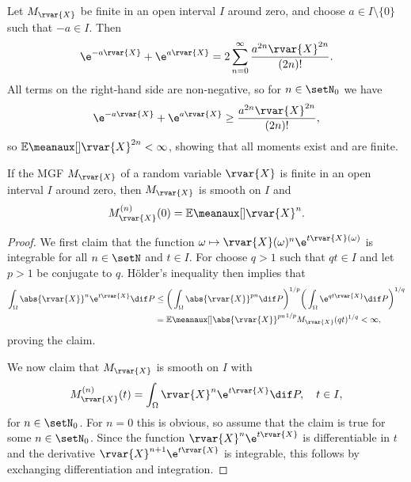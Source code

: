 \documentclass[article, a4paper, 11pt, oneside]{memoir}
\numberwithin{equation}{chapter}
\begin{document}
\begin{proofof}
    Let $M_{\rvar{X}}$ be finite in an open interval $I$ around zero, and choose $a \in I \setminus \{0\}$ such that $-a \in I$. Then
    \begin{equation*}
        \e^{-a\rvar{X}} + \e^{a\rvar{X}}
            = 2 \sum_{n=0}^\infty \frac{a^{2n} \rvar{X}^{2n}}{(2n)!}.
    \end{equation*}
    All terms on the right-hand side are non-negative, so for $n \in \setN_0$ we have
    \begin{equation*}
        \e^{-a\rvar{X}} + \e^{a\rvar{X}}
            \geq \frac{a^{2n} \rvar{X}^{2n}}{(2n)!},
    \end{equation*}
    so $\mean{\rvar{X}^{2n}} < \infty$, showing that all moments exist and are finite.
\end{proofof}


\begin{proposition}
    If the MGF $M_{\rvar{X}}$ of a random variable $\rvar{X}$ is finite in an open interval $I$ around zero, then $M_{\rvar{X}}$ is smooth on $I$ and
    \begin{equation*}
        M_{\rvar{X}}^{(n)}(0) = \mean{\rvar{X}^n}.
    \end{equation*}
\end{proposition}


\begin{proof}
    We first claim that the function $\omega \mapsto \rvar{X}(\omega)^n \e^{t\rvar{X}(\omega)}$ is integrable for all $n \in \setN$ and $t \in I$. For choose $q > 1$ such that $qt \in I$ and let $p > 1$ be conjugate to $q$. Hölder's inequality then implies that
    \begin{align*}
        \int_\Omega \abs{\rvar{X}}^n \e^{t\rvar{X}} \dif P
            &\leq \bigg( \int_\Omega \abs{\rvar{X}}^{pn} \dif P \bigg)^{1/p}
                  \bigg( \int_\Omega \e^{qt\rvar{X}} \dif P \bigg)^{1/q} \\
            &= \mean{\abs{\rvar{X}}^{pn}}^{1/p} M_{\rvar{X}}(qt)^{1/q}
             < \infty,
    \end{align*}
    proving the claim.

    We now claim that $M_{\rvar{X}}$ is smooth on $I$ with
    \begin{equation*}
        M_{\rvar{X}}^{(n)}(t) = \int_\Omega \rvar{X}^n \e^{t\rvar{X}} \dif P,
        \quad t \in I,
    \end{equation*}
    for $n \in \setN_0$. For $n = 0$ this is obvious, so assume that the claim is true for some $n \in \setN_0$. Since the function $\rvar{X}^n \e^{t\rvar{X}}$ is differentiable in $t$ and the derivative $\rvar{X}^{n+1} \e^{t\rvar{X}}$ is integrable, this follows by exchanging differentiation and integration.
\end{proof}
\end{document}
